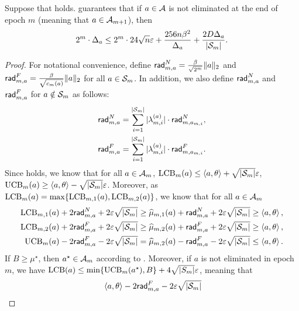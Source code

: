 \begin{lemma}\label{lem:delta_1_loss_miss}
    Suppose that  holds.  guarantees that if $a\in{\mathcal{A}}$ is not eliminated at the end of epoch $m$ (meaning that $a\in {\mathcal{A}}_{m+1}$), then 
    \begin{align*}
        2^m\cdot \Delta_a\leq 2^m\cdot 24\sqrt{n}\varepsilon+\frac{256n\beta^2}{\Delta_a} + \frac{2D\Delta_a}{|{\mathcal{S}}_m|}.
    \end{align*}
\end{lemma}
\begin{proof}
    For notational convenience, define $\mathsf{rad}_{m,a}^{N} = \frac{\beta}{\sqrt{2^m}}\|a\|_2$ and $\mathsf{rad}_{m,a}^{F} = \frac{\beta}{\sqrt{c_m(a)}}\|a\|_2$ for all $a\in {\mathcal{S}}_m$. In addition, we also define $\mathsf{rad}_{m,a}^{N}$ and $\mathsf{rad}_{m,a}^{F}$ for $a\notin {\mathcal{S}}_m$ as follows:
    \begin{align*}
        \mathsf{rad}_{m,a}^{N} &= \sum_{i=1}^{|{\mathcal{S}}_m|}|\lambda_{m,i}^{(a)}|\cdot \mathsf{rad}_{m,a_{m,i}}^{N}, \\
        \mathsf{rad}_{m,a}^{F} &= \sum_{i=1}^{|{\mathcal{S}}_m|}|\lambda_{m,i}^{(a)}|\cdot \mathsf{rad}_{m,a_{m,i}}^{F}.
    \end{align*}
    Since  holds, we know that for all $a\in{\mathcal{A}}_m$, ${\operatorname{LCB}}_m(a)\leq \left\langle {a,\theta} \right\rangle + \sqrt{|{\mathcal{S}}_m|}\varepsilon$, ${\operatorname{UCB}}_m(a)\geq \left\langle {a,\theta} \right\rangle - \sqrt{|{\mathcal{S}}_m|}\varepsilon$. Moreover, as ${\operatorname{LCB}}_m(a)=\max\{{\operatorname{LCB}}_{m,1}(a),{\operatorname{LCB}}_{m,2}(a)\}$, we know that for all $a\in {\mathcal{A}}_m$
    \begin{align*}
        {\operatorname{LCB}}_{m,1}(a) + 2\mathsf{rad}_{m,a}^{N} + 2\varepsilon\sqrt{|{\mathcal{S}}_m|}\geq  \widehat{\mu}_{m,1}(a) + \mathsf{rad}_{m,a}^{N} + 2\varepsilon\sqrt{|{\mathcal{S}}_m|}\geq \left\langle {a,\theta} \right\rangle,\\
        {\operatorname{LCB}}_{m,2}(a) + 2\mathsf{rad}_{m,a}^{F} + 2\varepsilon\sqrt{|{\mathcal{S}}_m|}\geq  \widehat{\mu}_{m,2}(a) + \mathsf{rad}_{m,a}^{F} + 2\varepsilon\sqrt{|{\mathcal{S}}_m|}\geq \left\langle {a,\theta} \right\rangle,\\
        {\operatorname{UCB}}_{m}(a) - 2\mathsf{rad}_{m,a}^{F} - 2\varepsilon\sqrt{|{\mathcal{S}}_m|} = \widehat{\mu}_{m,2}(a) - \mathsf{rad}_{m,a}^{F}-2\varepsilon\sqrt{|{\mathcal{S}}_m|}\leq \left\langle {a,\theta} \right\rangle.        
    \end{align*}
    If $B\geq \mu^\star$, then $a^\star\in {\mathcal{A}}_m$ according to .
    Moreover, if $a$ is not eliminated in epoch $m$, we have ${\operatorname{LCB}}(a)\leq \min\{{\operatorname{UCB}}_m(a^\star),B\}+4\sqrt{|S_m|}\varepsilon$, meaning that
    \begin{align*}
        &\inner{a,\theta} - 2\rad_{m,a}^{F} - 2\epsilon\sqrt{|\calS_m|} \\

\end{align*}
\end{proof}
